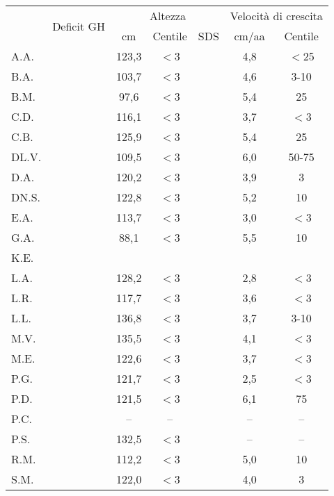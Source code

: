 \begin{table}[!h]
\begin{center}
\addtolength{\tabcolsep}{5pt}
\renewcommand{\arraystretch}{1.1}
\begin{tabular}{lcccccc}
\toprule
 & \multirow{2}{*}{Deficit GH} & \multicolumn{3}{c}{Altezza} & \multicolumn{2}{c}{Velocità di crescita} \\
 \cmidrule(r){3-5}  \cmidrule(r){6-7}
 &    									& cm & Centile & SDS & cm/aa & Centile \\
A.A.	&  				 				& 123,3 & $<$3 &  & 4,8 & $<$25  \\
B.A.	& \checkmark 	  				& 103,7 & $<$3 &  & 4,6 & 3-10   \\
B.M.	& \checkmark 	  				&  97,6 & $<$3 &  & 5,4 & 25     \\
C.D.	& \checkmark 	  				& 116,1 & $<$3 &  & 3,7 & $<$3   \\
C.B.	&  				 	            & 125,9 & $<$3 &  & 5,4 & 25     \\
DL.V.	& \checkmark 	  				& 109,5 & $<$3 &  & 6,0 & 50-75  \\
D.A.	&  				  				& 120,2 & $<$3 &  & 3,9 & 3      \\
DN.S.	& \checkmark 	  				& 122,8 & $<$3 &  & 5,2 & 10     \\
E.A.	&  				  				& 113,7 & $<$3 &  & 3,0 & $<$3   \\
G.A.	&  				  				&  88,1 & $<$3 &  & 5,5 & 10     \\
K.E.	&  				  				&  &  &  &  &    \\
L.A.	& \checkmark 	  				& 128,2 & $<$3 &  & 2,8 & $<$3   \\
L.R.	&  				  				& 117,7 & $<$3 &  & 3,6 & $<$3   \\
L.L.	&  				  				& 136,8 & $<$3 &  & 3,7 & 3-10   \\
M.V.	& \checkmark 	  				& 135,5 & $<$3 &  & 4,1 & $<$3   \\
M.E.	&  				  				& 122,6 & $<$3 &  & 3,7 & $<$3   \\
P.G.	& \checkmark 	  				& 121,7 & $<$3 &  & 2,5 & $<$3   \\
P.D.	&  				  				& 121,5 & $<$3 &  & 6,1 & 75     \\
P.C.	&  				  				& --    & --   &  & --  & --     \\
P.S.	&  				  				& 132,5 & $<$3 &  & --  & --     \\
R.M.	& \checkmark 	  				& 112,2 & $<$3 &  & 5,0 & 10     \\
S.M.	& \checkmark 	  				& 122,0 & $<$3 &  & 4,0 & 3      \\

\end{tabular}
\end{center}
\end{table}
